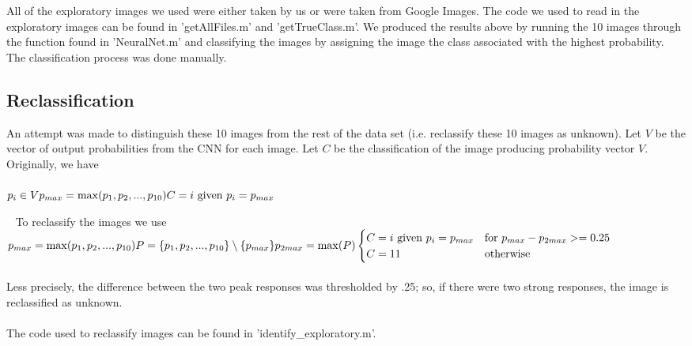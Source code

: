 \documentclass[11pt,english]{article}
\begin{document}
~\\~\\
\noindent
All of the exploratory images we used were either taken by us or were taken from Google Images. The code we used to read in the exploratory images can be found in 'getAllFiles.m' and 'getTrueClass.m'. We produced the results above by running the 10 images through the function found in 'NeuralNet.m' and classifying the images by assigning the image the class associated with the highest probability. The classification process was done manually.

\subsection{Reclassification}
An attempt was made to distinguish these 10 images from the rest of the data set (i.e. reclassify these 10 images as unknown).  Let $V$ be the vector of output probabilities from the CNN for each image.  Let $C$ be the classification of the image producing probability vector $V$.  Originally, we have\\~\\
\begin{math}
p_i \in V \\
p_{max} = \max(p_1, p_2,...,p_{10}) \\
C = i $ given $ p_i = p_{max}
\end{math}

~\newline\noindent
To reclassify the images we use\\
\noindent
\begin{math}
p_{max} = \max(p_1,p_2,...,p_{10}) \\
P = \{p_1,p_2,...,p_{10}\} \setminus \{p_{max}\} \\
p_{2max} = \max(P) \\~\\
\begin{cases}
C = i $ given $ p_i = p_{max} & $for	$ p_{max} - p_{2max} >= 0.25 \\
C = 11 & $otherwise$
\end{cases}
\end{math}
~\\~\\
Less precisely, the difference between the two peak responses was thresholded by .25; so, if there were two strong responses, the image is reclassified as unknown.
~\\~\\
The code used to reclassify images can be found in 'identify\_exploratory.m'.
\end{document}
